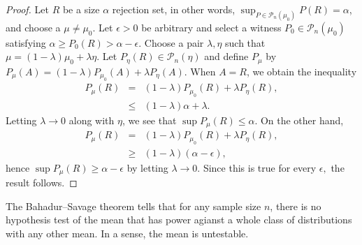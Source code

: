 \begin{proof}
Let $R$ be a size $\alpha$ rejection set, in other words, $\sup_{P\in\mathcal{P}_{n}(\mu_{0})}P(R)=\alpha$,
and choose a $\mu\neq\mu_{0}$. Let $\epsilon>0$ be arbitrary and
select a witness $P_{0}\in\mathcal{P}_{n}(\mu_{0})$ satisfying $\alpha\ge P_{0}(R)>\alpha-\epsilon$.
Choose a pair $\lambda,\eta$ such that $\mu=(1-\lambda)\mu_{0}+\lambda\eta$.
Let $P_{\eta}(R)\in\mathcal{P}_{n}(\eta)$ and define $P_{\mu}$ by
$P_{\mu}(A)=(1-\lambda)P_{\mu_{0}}(A)+\lambda P_{\eta}(A).$ When
$A=R$, we obtain the inequality
\begin{eqnarray*}
P_{\mu}(R) & = & (1-\lambda)P_{\mu_{0}}(R)+\lambda P_{\eta}(R),\\
 & \leq & (1-\lambda)\alpha+\lambda.
\end{eqnarray*}
Letting $\lambda\to0$ along with $\eta$, we see that $\sup P_{\mu}(R)\leq\alpha$.
On the other hand,
\begin{eqnarray*}
P_{\mu}(R) & = & (1-\lambda)P_{\mu_{0}}(R)+\lambda P_{\eta}(R),\\
 & \geq & (1-\lambda)(\alpha-\epsilon),
\end{eqnarray*}
hence $\sup P_{\mu}(R)\geq\alpha-\epsilon$ by letting $\lambda\to0$.
Since this is true for every $\epsilon,$ the result follows.
\end{proof}
The Bahadur--Savage theorem tells that for any sample size $n$,
there is no hypothesis test of the mean that has power agianst a whole
class of distributions with any other mean. In a sense, the mean is
untestable.




